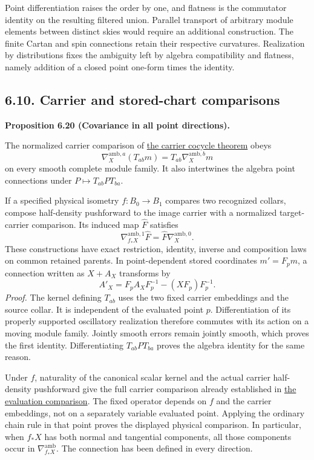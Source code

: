 \documentclass[
  english,
  11pt,
  reqno]{amsart}
\makeatletter
\newcommand{\paperdisplaynext}{%
  \let\paper@savedstartsection\@startsection
  \def\@startsection##1##2##3##4##5##6{%
    \let\@startsection\paper@savedstartsection
    \@tempskipa ##5\relax
    \ifdim\@tempskipa<\z@
      \def\paper@afterskip{.35\baselineskip}%
    \else
      \def\paper@afterskip{##5}%
    \fi
    \@startsection{##1}{##2}{##3}{##4}{\paper@afterskip}{##6}}}
\newcommand{\paperdisplaysection}{\paperdisplaynext\subsection}
\newcommand{\pandocstatementheading}[1]{%
  \par\if@nobreak\else
    \addpenalty{\@beginparpenalty}%
    \addvspace{.5\baselineskip plus .2\baselineskip minus .2\baselineskip}%
  \fi
  {\normalfont\bfseries #1\par}%
  \nobreak\@afterindenttrue\@afterheading
}
\let\paper@displaysection\paperdisplaysection
\renewcommand{\paperdisplaysection}[1]{%
  \let\paper@savedhangfrom\@hangfrom
  \long\def\@hangfrom##1##2{%
    \paper@savedhangfrom{##1}{\paper@headingparagraph##2}}%
  \paper@displaysection{#1}%
  \let\@hangfrom\paper@savedhangfrom}
\makeatother
\begin{document}
Point differentiation raises the order by one, and flatness is the
commutator identity on the resulting filtered union. Parallel transport
of arbitrary module elements between distinct skies would require an
additional construction. The finite Cartan and spin connections retain
their respective curvatures. Realization by distributions fixes the
ambiguity left by algebra compatibility and flatness, namely addition of
a closed point one-form times the identity.

\paperdisplaysection{6.10. Carrier and stored-chart
comparisons}\label{carrier-and-stored-chart-comparisons}\label{sec:online-point-connection-covariance}

\pandocstatementheading{\leavevmode{}\label{prop:online-ambient-carrier-covariance}Proposition 6.20 (Covariance in all point directions).}

The normalized carrier comparison of
\hyperref[thm:online-wave-carrier-cocycle]{the carrier cocycle theorem}
obeys%
 \[
\nabla_X^{\mathrm{amb},a}(T_{ab}m)
=T_{ab}\nabla_X^{\mathrm{amb},b}m
\] on every smooth complete module family. It also intertwines the
algebra point connections under \(P\mapsto T_{ab}PT_{ba}\).

If a specified physical isometry \(f:B_0\to B_1\) compares two
recognized collars, compose half-density pushforward to the image
carrier with a normalized target-carrier comparison. Its induced map
\(\widehat F\) satisfies%
 \[
\nabla_{f_*X}^{\mathrm{amb},1}\widehat F
=\widehat F\nabla_X^{\mathrm{amb},0}.
\] These constructions have exact restriction, identity, inverse and
composition laws on common retained parents. In point-dependent stored
coordinates \(m'=F_pm\), a connection written as \(X+A_X\) transforms by%
 \[
A'_X=F_pA_XF_p^{-1}-(XF_p)F_p^{-1}.
\] \emph{Proof.} The kernel defining \(T_{ab}\) uses the two fixed
carrier embeddings and the source collar. It is independent of the
evaluated point \(p\). Differentiation of its properly supported
oscillatory realization therefore commutes with its action on a moving
module family. Jointly smooth errors remain jointly smooth, which proves
the first identity. Differentiating \(T_{ab}PT_{ba}\) proves the algebra
identity for the same reason.

Under \(f\), naturality of the canonical scalar kernel and the actual
carrier half-density pushforward give the full carrier comparison
already established in
\hyperref[prop:online-wave-full-evaluation-comparison]{the evaluation
comparison}. The fixed operator depends on \(f\) and the carrier
embeddings, not on a separately variable evaluated point. Applying the
ordinary chain rule in that point proves the displayed physical
comparison. In particular, when \(f_*X\) has both normal and tangential
components, all those components occur in
\(\nabla_{f_*X}^{\mathrm{amb}}\). The connection has been defined in
every direction.
\end{document}
